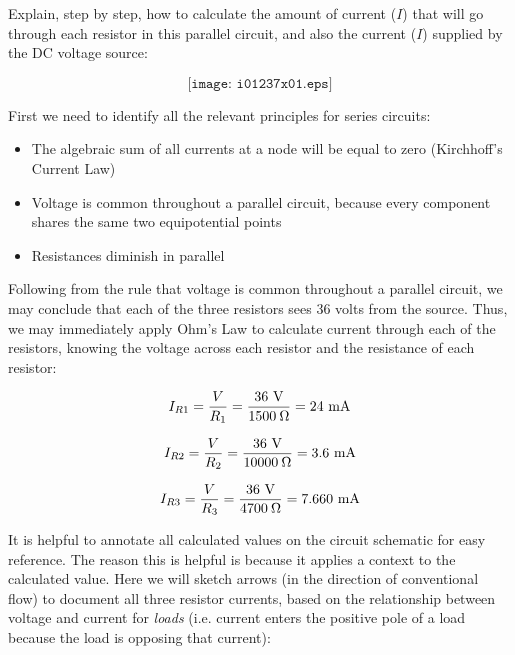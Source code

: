 

Explain, step by step, how to calculate the amount of current ($I$) that will go through each resistor in this parallel circuit, and also the current ($I$) supplied by the DC voltage source:

$$\texttt{[image: i01237x01.eps]}$$







First we need to identify all the relevant principles for series circuits:

\begin{itemize}
\item{} The algebraic sum of all currents at a node will be equal to zero (Kirchhoff's Current Law)
\item{} Voltage is common throughout a parallel circuit, because every component shares the same two equipotential points
\item{} Resistances diminish in parallel
\end{itemize}

Following from the rule that voltage is common throughout a parallel circuit, we may conclude that each of the three resistors sees 36 volts from the source.  Thus, we may immediately apply Ohm's Law to calculate current through each of the resistors, knowing the voltage across each resistor and the resistance of each resistor:

$$I_{R1} = {V \over R_1} = {36 \hbox{ V} \over 1500 \> \Omega} = 24 \hbox{ mA}$$

$$I_{R2} = {V \over R_2} = {36 \hbox{ V} \over 10000 \> \Omega} = 3.6 \hbox{ mA}$$

$$I_{R3} = {V \over R_3} = {36 \hbox{ V} \over 4700 \> \Omega} = 7.660 \hbox{ mA}$$

It is helpful to annotate all calculated values on the circuit schematic for easy reference.  The reason this is helpful is because it applies a context to the calculated value.  Here we will sketch arrows (in the direction of conventional flow) to document all three resistor currents, based on the relationship between voltage and current for {\it loads} (i.e. current enters the positive pole of a load because the load is opposing that current):

